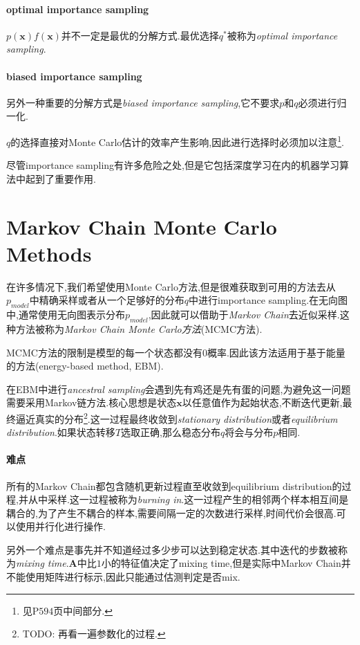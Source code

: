 \paragraph{optimal importance sampling}$p(\mathbf x)f(\mathbf x)$并不一定是最优的分解方式.最优选择$q^\ast$被称为\textit{optimal importance sampling}.

\paragraph{biased importance sampling}另外一种重要的分解方式是\textit{biased importance sampling},它不要求$p$和$q$必须进行归一化.

$q$的选择直接对Monte Carlo估计的效率产生影响,因此进行选择时必须加以注意\footnote{见P$594$页中间部分.}.

尽管importance sampling有许多危险之处,但是它包括深度学习在内的机器学习算法中起到了重要作用.

\section{Markov Chain Monte Carlo Methods}

在许多情况下,我们希望使用Monte Carlo方法,但是很难获取到可用的方法去从$p_{model}$中精确采样或者从一个足够好的分布$q$中进行importance sampling.在无向图中,通常使用无向图表示分布$p_{model}$,因此就可以借助于\textit{Markov Chain}去近似采样.这种方法被称为\textit{Markov Chain Monte Carlo方法}(MCMC方法).

MCMC方法的限制是模型的每一个状态都没有$0$概率.因此该方法适用于基于能量的方法(energy-based method, EBM).

在EBM中进行\textit{ancestral sampling}会遇到先有鸡还是先有蛋的问题,为避免这一问题需要采用Markov链方法.核心思想是状态$\mathbf x$以任意值作为起始状态,不断迭代更新,最终逼近真实的分布\footnote{TODO: 再看一遍参数化的过程.}.这一过程最终收敛到\textit{stationary distribution}或者\textit{equilibrium distribution}.如果状态转移$T$选取正确,那么稳态分布$q$将会与分布$p$相同.

\paragraph{难点} 所有的Markov Chain都包含随机更新过程直至收敛到equilibrium distribution的过程,并从中采样.这一过程被称为\textit{burning in}.这一过程产生的相邻两个样本相互间是耦合的,为了产生不耦合的样本,需要间隔一定的次数进行采样,时间代价会很高.可以使用并行化进行操作.

另外一个难点是事先并不知道经过多少步可以达到稳定状态.其中迭代的步数被称为\textit{mixing time}.$\mathbf A$中比$1$小的特征值决定了mixing time,但是实际中Markov Chain并不能使用矩阵进行标示,因此只能通过估测判定是否mix.


